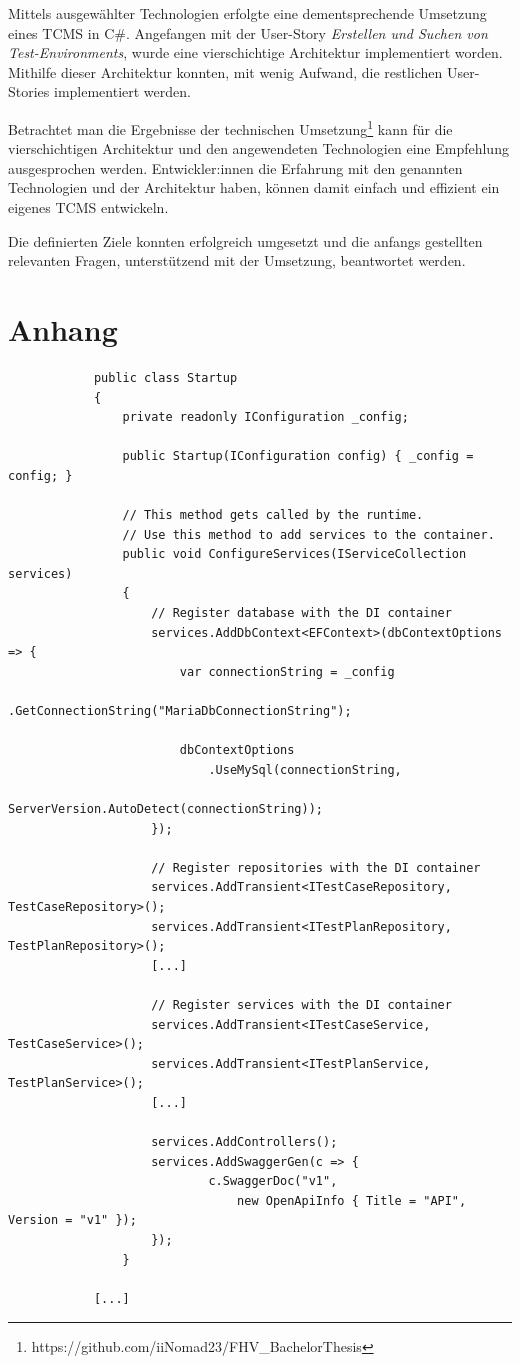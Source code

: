 \documentclass[a4paper, fontsize=11pt, parskip=half, twoside]{scrreprt}
\begin{document}
	Mittels ausgewählter Technologien erfolgte eine dementsprechende Umsetzung eines \ac{TCMS} in C\#.
	Angefangen mit der User-Story \emph{Erstellen und Suchen von Test-Environments}, wurde eine vierschichtige Architektur implementiert worden.
	Mithilfe dieser Architektur konnten, mit wenig Aufwand, die restlichen User-Stories implementiert werden.
	
	Betrachtet man die Ergebnisse der technischen Umsetzung\footnote{https://github.com/iiNomad23/FHV\_BachelorThesis} kann für die vierschichtigen Architektur und den angewendeten Technologien eine Empfehlung ausgesprochen werden. 
	Entwickler:innen die Erfahrung mit den genannten Technologien und der Architektur haben, können damit einfach und effizient ein eigenes \ac{TCMS} entwickeln.
	
	Die definierten Ziele konnten erfolgreich umgesetzt und die anfangs gestellten relevanten Fragen, unterstützend mit der Umsetzung, beantwortet werden.
	
	
	\clearpage
	\printbibliography
	
	\chapter*{Anhang}
	\begin{listing}[ht]
		\begin{verbatim}
			public class Startup
			{
				private readonly IConfiguration _config;		
				
				public Startup(IConfiguration config) { _config = config; }
				
				// This method gets called by the runtime. 
				// Use this method to add services to the container.
				public void ConfigureServices(IServiceCollection services)
				{
					// Register database with the DI container
					services.AddDbContext<EFContext>(dbContextOptions => {
						var connectionString = _config
							.GetConnectionString("MariaDbConnectionString");	
									
						dbContextOptions
							.UseMySql(connectionString,
								ServerVersion.AutoDetect(connectionString));
					});
					
					// Register repositories with the DI container
					services.AddTransient<ITestCaseRepository, TestCaseRepository>();
					services.AddTransient<ITestPlanRepository, TestPlanRepository>();
					[...]
					
					// Register services with the DI container
					services.AddTransient<ITestCaseService, TestCaseService>();
					services.AddTransient<ITestPlanService, TestPlanService>();
					[...]
					
					services.AddControllers();
					services.AddSwaggerGen(c => { 
							c.SwaggerDoc("v1", 
								new OpenApiInfo { Title = "API", Version = "v1" }); 
					});
				}
				
			[...]
		\end{verbatim}
		\caption{\emph{Startup}-Klasse Teil 1}
		\label{lst:startupClassPart1}
	\end{listing}
\end{document}
